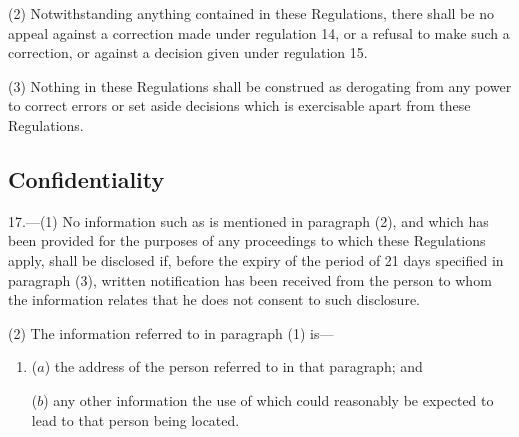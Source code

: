 \documentclass[a4paper]{article}
\begin{document}
(2) Notwithstanding anything contained in these Regulations, there shall be no appeal against a correction made under regulation 14, or a refusal to make such a correction, or against a decision given under regulation 15.

(3) Nothing in these Regulations shall be construed as derogating from any power to correct errors or set aside decisions which is exercisable apart from these Regulations.

%
%
%

\subsection[17. Confidentiality]{Confidentiality}

17.—(1) No information such as is mentioned in paragraph (2), and which has been provided for the purposes of any proceedings to which these Regulations apply, shall be disclosed if, before the expiry of the period of 21 days specified in paragraph (3), written notification has been received from the person to whom the information relates that he does not consent to such disclosure.

(2) The information referred to in paragraph (1) is—
\begin{enumerate}\item[]
($a$) the address of the person referred to in that paragraph; and

($b$) any other information the use of which could reasonably be expected to lead to that person being located.
\end{enumerate}
\end{document}
